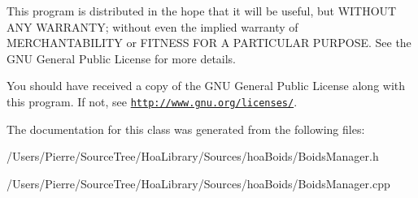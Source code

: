 This program is distributed in the hope that it will be useful, but W\-I\-T\-H\-O\-U\-T A\-N\-Y W\-A\-R\-R\-A\-N\-T\-Y; without even the implied warranty of M\-E\-R\-C\-H\-A\-N\-T\-A\-B\-I\-L\-I\-T\-Y or F\-I\-T\-N\-E\-S\-S F\-O\-R A P\-A\-R\-T\-I\-C\-U\-L\-A\-R P\-U\-R\-P\-O\-S\-E. See the G\-N\-U General Public License for more details.

You should have received a copy of the G\-N\-U General Public License along with this program. If not, see \href{http://www.gnu.org/licenses/}{\tt http\-://www.\-gnu.\-org/licenses/}. 

The documentation for this class was generated from the following files\-:\begin{DoxyCompactItemize}
\item 
/\-Users/\-Pierre/\-Source\-Tree/\-Hoa\-Library/\-Sources/hoa\-Boids/Boids\-Manager.\-h\item 
/\-Users/\-Pierre/\-Source\-Tree/\-Hoa\-Library/\-Sources/hoa\-Boids/Boids\-Manager.\-cpp\end{DoxyCompactItemize}
